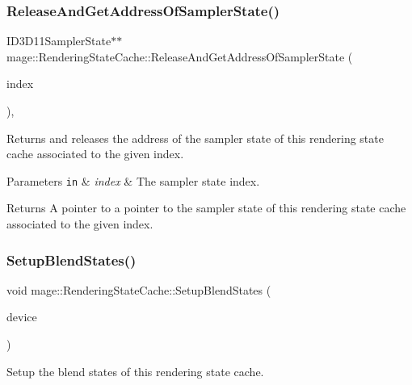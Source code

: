 \subsubsection{\texorpdfstring{Release\+And\+Get\+Address\+Of\+Sampler\+State()}{ReleaseAndGetAddressOfSamplerState()}}
{\footnotesize\ttfamily I\+D3\+D11\+Sampler\+State$\ast$$\ast$ mage\+::\+Rendering\+State\+Cache\+::\+Release\+And\+Get\+Address\+Of\+Sampler\+State (\begin{DoxyParamCaption}\item[{\hyperlink{structmage_1_1_rendering_state_cache_a4e1d4796699929e0618ff54621910770}{Sampler\+State\+Index}}]{index }\end{DoxyParamCaption})\hspace{0.3cm}{\ttfamily [private]}, {\ttfamily [noexcept]}}

Returns and releases the address of the sampler state of this rendering state cache associated to the given index.


\begin{DoxyParams}[1]{Parameters}
\mbox{\tt in}  & {\em index} & The sampler state index. \\
\hline
\end{DoxyParams}
\begin{DoxyReturn}{Returns}
A pointer to a pointer to the sampler state of this rendering state cache associated to the given index. 
\end{DoxyReturn}
\hypertarget{structmage_1_1_rendering_state_cache_a62b31448f7ffede34ec0d90740463719}{}\label{structmage_1_1_rendering_state_cache_a62b31448f7ffede34ec0d90740463719} 
\subsubsection{\texorpdfstring{Setup\+Blend\+States()}{SetupBlendStates()}}
{\footnotesize\ttfamily void mage\+::\+Rendering\+State\+Cache\+::\+Setup\+Blend\+States (\begin{DoxyParamCaption}\item[{I\+D3\+D11\+Device2 $\ast$}]{device }\end{DoxyParamCaption})\hspace{0.3cm}{\ttfamily [private]}}

Setup the blend states of this rendering state cache.

